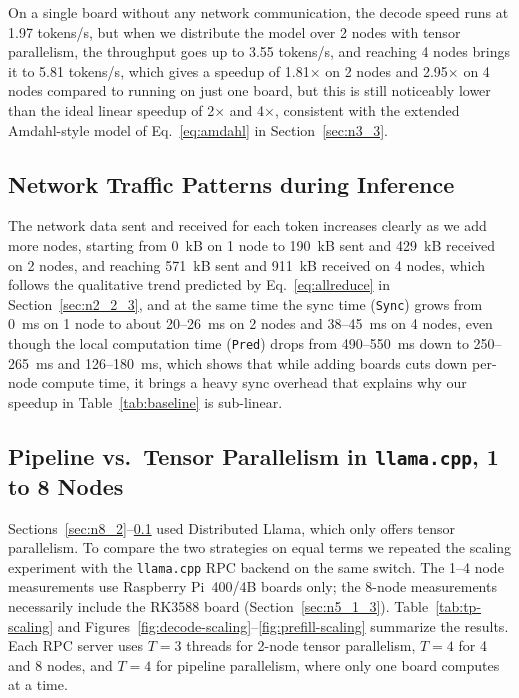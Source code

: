\documentclass[11pt,a4paper]{article}
\begin{document}
On a single board without any network communication, the decode speed runs at 1.97 tokens/s, but when we distribute the model over 2 nodes with tensor parallelism, the throughput goes up to 3.55 tokens/s, and reaching 4 nodes brings it to 5.81 tokens/s, which gives a speedup of 1.81$\times$ on 2 nodes and 2.95$\times$ on 4 nodes compared to running on just one board, but this is still noticeably lower than the ideal linear speedup of 2$\times$ and 4$\times$, consistent with the extended Amdahl-style model of Eq.~\ref{eq:amdahl} in Section~\ref{sec:n3_3}.

\subsection{Network Traffic Patterns during Inference}\label{sec:n8_3}
The network data sent and received for each token increases clearly as we add more nodes, starting from 0~kB on 1 node to 190~kB sent and 429~kB received on 2 nodes, and reaching 571~kB sent and 911~kB received on 4 nodes, which follows the qualitative trend predicted by Eq.~\ref{eq:allreduce} in Section~\ref{sec:n2_2_3}, and at the same time the sync time (\texttt{Sync}) grows from 0~ms on 1 node to about 20--26~ms on 2 nodes and 38--45~ms on 4 nodes, even though the local computation time (\texttt{Pred}) drops from 490--550~ms down to 250--265~ms and 126--180~ms, which shows that while adding boards cuts down per-node compute time, it brings a heavy sync overhead that explains why our speedup in Table~\ref{tab:baseline} is sub-linear.

\subsection{Pipeline vs.\ Tensor Parallelism in \texttt{llama.cpp}, 1 to 8 Nodes}\label{sec:n8_4}

Sections~\ref{sec:n8_2}--\ref{sec:n8_3} used Distributed Llama, which only offers tensor parallelism. To compare the two strategies on equal terms we repeated the scaling experiment with the \texttt{llama.cpp} RPC backend on the same switch. The 1--4 node measurements use Raspberry Pi~400/4B boards only; the 8-node measurements necessarily include the RK3588 board (Section~\ref{sec:n5_1_3}). Table~\ref{tab:tp-scaling} and Figures~\ref{fig:decode-scaling}--\ref{fig:prefill-scaling} summarize the results. Each RPC server uses $T=3$ threads for 2-node tensor parallelism, $T=4$ for 4 and 8 nodes, and $T=4$ for pipeline parallelism, where only one board computes at a time.
\end{document}
